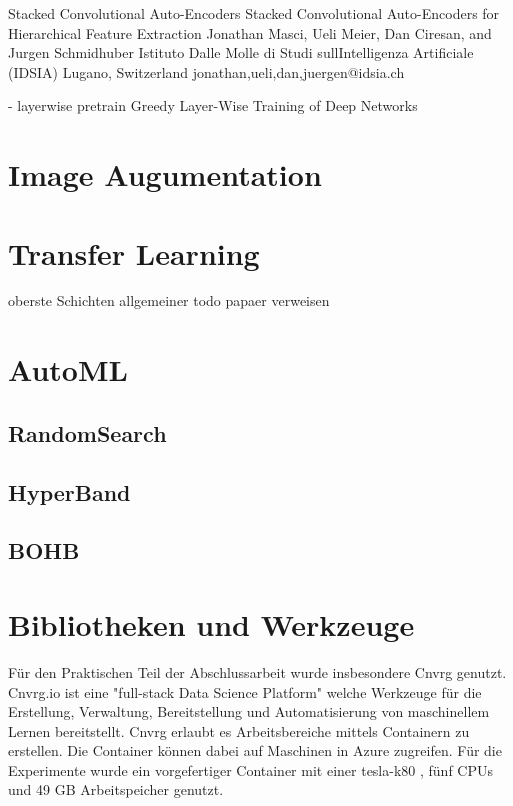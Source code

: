 		Stacked Convolutional Auto-Encoders Stacked Convolutional Auto-Encoders for
		Hierarchical Feature Extraction
		Jonathan Masci, Ueli Meier, Dan Ciresan, and Jurgen Schmidhuber
		Istituto Dalle Molle di Studi sullIntelligenza Artificiale (IDSIA)
		Lugano, Switzerland
		{jonathan,ueli,dan,juergen}@idsia.ch
		
		- layerwise pretrain {Greedy Layer-Wise Training of Deep Networks}
		
	\section{Image Augumentation}
	\section{Transfer Learning}
	\label{sec:TransferLearning}
			oberste Schichten allgemeiner todo papaer verweisen
	\section{AutoML}
	\label{sec:AutoML}
		
		\subsection{RandomSearch }
		
		\subsection{HyperBand }

		\subsection{BOHB }


	\section{Bibliotheken und Werkzeuge}
	\label{sec:BibliothekenundWerkzeuge}
	Für den Praktischen Teil der Abschlussarbeit wurde insbesondere Cnvrg \cite{cnvrg.io.} genutzt. Cnvrg.io ist eine "full-stack Data Science Platform" welche Werkzeuge für die Erstellung, Verwaltung, Bereitstellung und Automatisierung von maschinellem Lernen bereitstellt. Cnvrg erlaubt es Arbeitsbereiche mittels Containern zu erstellen. Die Container können dabei auf Maschinen in Azure \cite{Micorsoft.2020} zugreifen. Für die Experimente wurde ein vorgefertiger Container mit einer tesla-k80 \cite{Nvidia.2020}, fünf CPUs und 49 GB Arbeitspeicher genutzt. 

